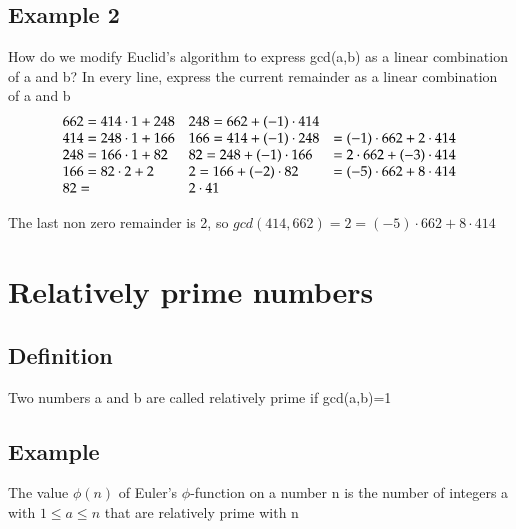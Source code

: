 \documentclass{article}[18pt]
\begin{document}
\subsection{Example 2}
How do we modify Euclid's algorithm to express gcd(a,b) as a linear combination of a and b?
In every line, express the current remainder as a linear combination of a and b
$$\begin{array} { l l l} { 662 = 414 \cdot 1 + 248 } & { 248 = 662 + ( - 1 ) \cdot 414 } & \\
 { 414 = 248 \cdot 1 + 166 } & { 166 = 414 + ( - 1 ) \cdot 248} &{= ( - 1 ) \cdot 662 + 2 \cdot 414 } \\
  { 248 = 166 \cdot 1 + 82 } & { 82 = 248 + ( - 1 ) \cdot 166}  &{= 2 \cdot 662 + ( - 3 ) \cdot 414 } \\
   { 166 = 82 \cdot 2 + 2 } & { 2 = 166 + ( - 2 ) \cdot 82 } &{=( - 5 ) \cdot 662 + 8 \cdot 414 } \\
    { 82 = } & { 2 \cdot 41 } \end{array}$$
    
 The last non zero remainder is 2, so $gcd(414,662)=2=(-5)\cdot 662+8\cdot 414$
 \section{Relatively prime numbers}
\subsection{Definition}
Two numbers a and b are called relatively prime if gcd(a,b)=1
\subsection{Example}
The value $\phi(n) $ of Euler's $\phi$-function on a number n is the number of integers a with $1\leqslant a \leqslant n$ that are relatively prime with n
\end{document}
